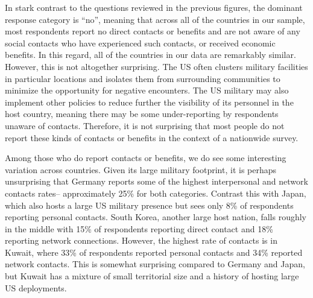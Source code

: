 In stark contrast to the questions reviewed in the previous figures, the dominant response category is ``no'', meaning that across all of the countries in our sample, most respondents report no direct contacts or benefits and are not aware of any social contacts who have experienced such contacts, or received economic benefits. In this regard, all of the countries in our data are remarkably similar. However, this is not altogether surprising. The US often clusters military facilities in particular locations and isolates them from surrounding communities to minimize the opportunity for negative encounters. The US military may also implement other policies to reduce further the visibility of its personnel in the host country, meaning there may be some under-reporting by respondents unaware of contacts. Therefore, it is not surprising that most people do not report these kinds of contacts or benefits in the context of a nationwide survey. 


Among those who do report contacts or benefits, we do see some interesting variation across countries. Given its large military footprint, it is perhaps unsurprising that Germany reports some of the highest interpersonal and network contacts rates-- approximately 25\% for both categories. Contrast this with Japan, which also hosts a large US military presence but sees only 8\% of respondents reporting personal contacts. South Korea, another large host nation, falls roughly in the middle with 15\% of respondents reporting direct contact and 18\% reporting network connections. However, the highest rate of contacts is in Kuwait, where 33\% of respondents reported personal contacts and 34\% reported network contacts. This is somewhat surprising compared to Germany and Japan, but Kuwait has a mixture of small territorial size and a history of hosting large US deployments.

